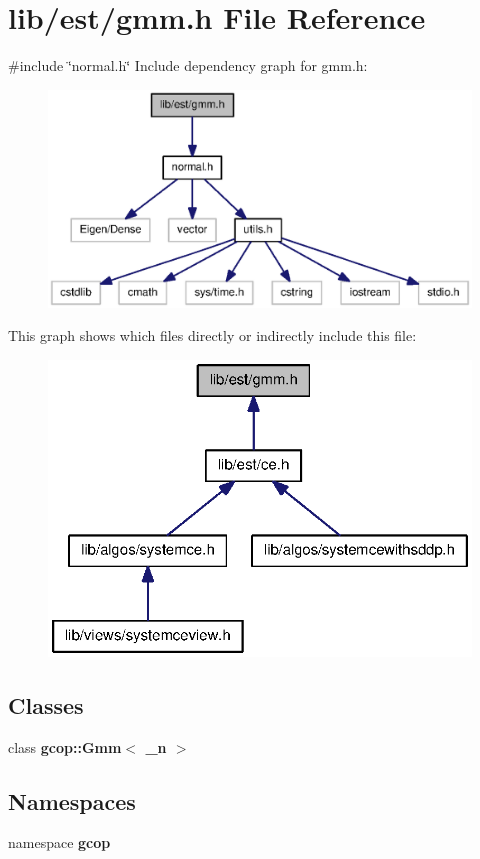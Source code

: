 \section{lib/est/gmm.h \-File \-Reference}
\label{gmm_8h}
{\ttfamily \#include \char`\"{}normal.\-h\char`\"{}}\*
\-Include dependency graph for gmm.\-h\-:
\nopagebreak
\begin{figure}[H]
\begin{center}
\leavevmode
\includegraphics[width=350pt]{gmm_8h__incl}
\end{center}
\end{figure}
\-This graph shows which files directly or indirectly include this file\-:
\nopagebreak
\begin{figure}[H]
\begin{center}
\leavevmode
\includegraphics[width=325pt]{gmm_8h__dep__incl}
\end{center}
\end{figure}
\subsection*{\-Classes}
\begin{DoxyCompactItemize}
\item 
class {\bf gcop\-::\-Gmm$<$ \-\_\-n $>$}
\end{DoxyCompactItemize}
\subsection*{\-Namespaces}
\begin{DoxyCompactItemize}
\item 
namespace {\bf gcop}
\end{DoxyCompactItemize}

